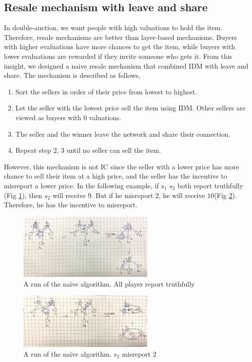 \subsection*{Resale mechanism with leave and share}
In double-auction, we want people with high valuations to hold the item. Therefore, resale mechanisms are better than
layer-based mechanisms. Buyers with higher evaluations have more chances to get the item, while buyers with lower
evaluations are rewarded if they invite someone who gets it. From this insight, we designed a naive
resale mechanism that combined IDM with leave and share. The mechanism is described as follows,
\begin{enumerate}
  \item Sort the sellers in order of their price from lowest to highest.
  \item Let the seller with the lowest price sell the item using IDM. Other sellers are viewed as buyers with 0 valuations.
  \item The seller and the winner leave the network and share their connection.
  \item Repeat step 2, 3 until no seller can sell the item.
\end{enumerate}
However, this mechanism is not IC since the seller with a lower price has more chance to sell their
item at a high price, and the seller has the incentive to misreport a lower price. In the following example, if \(s_1\)
\(s_2\) both report truthfully (Fig \ref*{fig:LeaveTruthful}), then \(s_2\) will receive \(9\). But
if he misreport \(2\), he will receive \(10\)(Fig \ref*{fig:LeaveMisreport}). Therefore, he has the incentive to misreport.
\begin{figure}[htbp]
  \includegraphics[width=0.6\textwidth]{figure/Leave_truthful.jpg}
  \caption{A run of the naive algorithm. All player report truthfully}
  \label{fig:LeaveTruthful}
\end{figure}
\begin{figure}[htbp]
  \includegraphics[width=0.6\textwidth]{figure/Leave_misreport.jpg}
  \caption{A run of the naive algorithm. \(s_2\) misreport \(2\)}
  \label{fig:LeaveMisreport}
\end{figure}

